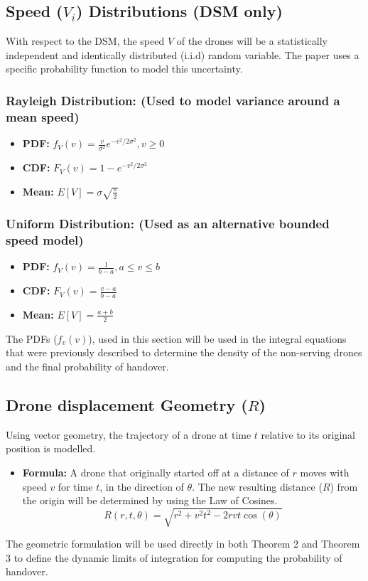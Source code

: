 \documentclass[12pt,a4paper]{article}
\begin{document}
   \subsection*{Speed ($V_i$) Distributions (DSM only)} %
With respect to the DSM, the speed $V$ of the drones will be a statistically independent and identically distributed (i.i.d) random variable.    %
The paper uses a specific probability function to model this uncertainty.    %

   \subsubsection*{Rayleigh Distribution: (Used to model variance around a mean speed)} %
\begin{itemize}
       \item \textbf{PDF:} $f_V(v) = \frac{v}{\sigma^2} e^{-v^2/2\sigma^2}, v \geq 0$ %
       \item \textbf{CDF:} $F_V(v) = 1 - e^{-v^2/2\sigma^2}$ %
       \item \textbf{Mean:} $E[V] = \sigma \sqrt{\frac{\pi}{2}}$ %
\end{itemize}

   \subsubsection*{Uniform Distribution: (Used as an alternative bounded speed model)} %
\begin{itemize}
       \item \textbf{PDF:} $f_V(v) = \frac{1}{b-a}, a \leq v \leq b$ %
       \item \textbf{CDF:} $F_V(v) = \frac{v-a}{b-a}$ %
       \item \textbf{Mean:} $E[V] = \frac{a+b}{2}$ %
\end{itemize}
The PDFs ($f_v(v)$), used in this section will be used in the integral equations that were previously described to determine the density of the non-serving drones and the final probability of handover.    %

   \subsection*{Drone displacement Geometry ($R$)} %
Using vector geometry, the trajectory of a drone at time $t$ relative to its original position is modelled.    %
\begin{itemize}
    \item \textbf{Formula:} A drone that originally started off at a distance of $r$ moves with speed $v$ for time $t$, in the direction of $\theta$.    %
    The new resulting distance ($R$) from the origin will be determined by using the Law of Cosines.    %
       $$R(r,t,\theta) = \sqrt{r^2+v^2t^2-2rvt\cos(\theta)}$$ %
\end{itemize}
The geometric formulation will be used directly in both Theorem 2 and Theorem 3 to define the dynamic limits of integration for computing the probability of handover.    %
\end{document}
